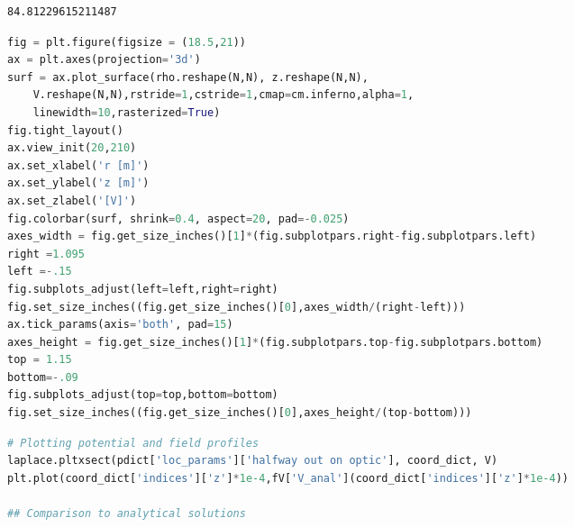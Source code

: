 \begin{spacing}{1.2} \begin{lstlisting}
84.81229615211487
\end{lstlisting} \end{spacing}

\begin{spacing}{1.2} \begin{lstlisting}[frame=single, language=Python]
fig = plt.figure(figsize = (18.5,21))
ax = plt.axes(projection='3d') 
surf = ax.plot_surface(rho.reshape(N,N), z.reshape(N,N),
    V.reshape(N,N),rstride=1,cstride=1,cmap=cm.inferno,alpha=1,
    linewidth=10,rasterized=True)
fig.tight_layout()
ax.view_init(20,210)
ax.set_xlabel('r [m]')
ax.set_ylabel('z [m]')
ax.set_zlabel('[V]')
fig.colorbar(surf, shrink=0.4, aspect=20, pad=-0.025)
axes_width = fig.get_size_inches()[1]*(fig.subplotpars.right-fig.subplotpars.left)
right =1.095
left =-.15
fig.subplots_adjust(left=left,right=right) 
fig.set_size_inches((fig.get_size_inches()[0],axes_width/(right-left)))
ax.tick_params(axis='both', pad=15)
axes_height = fig.get_size_inches()[1]*(fig.subplotpars.top-fig.subplotpars.bottom)
top = 1.15
bottom=-.09
fig.subplots_adjust(top=top,bottom=bottom)             
fig.set_size_inches((fig.get_size_inches()[0],axes_height/(top-bottom)))
\end{lstlisting} \end{spacing}

\begin{spacing}{1.2} \begin{lstlisting}[frame=single, language=Python]
# Plotting potential and field profiles
laplace.pltxsect(pdict['loc_params']['halfway out on optic'], coord_dict, V)
plt.plot(coord_dict['indices']['z']*1e-4,fV['V_anal'](coord_dict['indices']['z']*1e-4))

## Comparison to analytical solutions
\end{lstlisting} \end{spacing}


